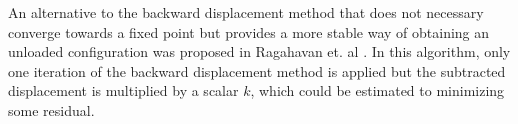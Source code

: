 An alternative to the backward displacement method that does not
necessary converge towards a fixed point but provides a more stable
way of obtaining an unloaded configuration was proposed in Ragahavan
et. al \cite{raghavan2006non}. In this algorithm, only one iteration of the
backward displacement method is applied but the subtracted
displacement is multiplied by a scalar $k$, which could be estimated
to minimizing some residual.





